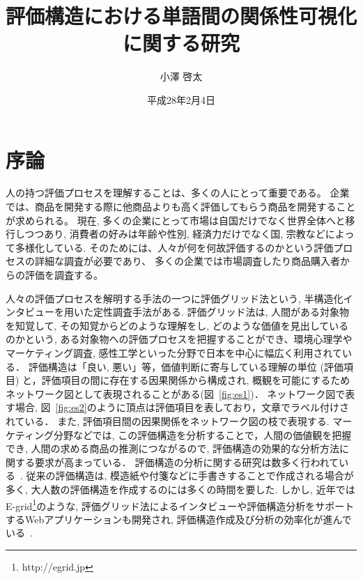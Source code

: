 \documentclass[syuuron]{kuee}
\title{評価構造における単語間の関係性可視化に関する研究}
\author{小澤 啓太}
\date{平成28年2月4日}
\begin{document}
\maketitle
\tableofcontents


\chapter{序論}
	人の持つ評価プロセスを理解することは、多くの人にとって重要である。
	企業では、商品を開発する際に他商品よりも高く評価してもらう商品を開発することが求められる。
	現在, 多くの企業にとって市場は自国だけでなく世界全体へと移行しつつあり, 
	消費者の好みは年齢や性別, 経済力だけでなく国, 宗教などによって多様化している. 
	そのためには、人々が何を何故評価するのかという評価プロセスの詳細な調査が必要であり、
	多くの企業では市場調査したり商品購入者からの評価を調査する。
	
	人々の評価プロセスを解明する手法の一つに評価グリッド法という, 半構造化インタビューを用いた定性調査手法がある. 
	評価グリッド法は, 人間がある対象物を知覚して, その知覚からどのような理解をし, どのような価値を見出しているのかという, 
	ある対象物への評価プロセスを把握することができ、環境心理学やマーケティング調査, 感性工学といった分野で日本を中心に幅広く利用されている\cite{sen1}．
	評価構造は「良い, 悪い」等，価値判断に寄与している理解の単位 (評価項目) と，評価項目の間に存在する因果関係から構成され, 
	概観を可能にするためネットワーク図として表現されることがある(図~\ref{fig:es1})．
	ネットワーク図で表す場合, 図~\ref{fig:es2}のように頂点は評価項目を表しており，文章でラベル付けされている．
	また, 評価項目間の因果関係をネットワーク図の枝で表現する. 
	マーケティング分野などでは, この評価構造を分析することで，人間の価値観を把握でき, 人間の求める商品の推測につながるので, 
	評価構造の効果的な分析方法に関する要求が高まっている\cite{egm6, egm7}．
	評価構造の分析に関する研究は数多く行われている~\cite{egm8, egm9}. 
	従来の評価構造は, 模造紙や付箋などに手書きすることで作成される場合が多く, 大人数の評価構造を作成するのには多くの時間を要した. 
	しかし, 近年ではE-grid\footnote{http://egrid.jp}のような, 評価グリッド法によるインタビューや評価構造分析をサポートするWebアプリケーションも開発され, 
	評価構造作成及び分析の効率化が進んでいる~\cite{egm6, egm10}. 
	
\end{document}
